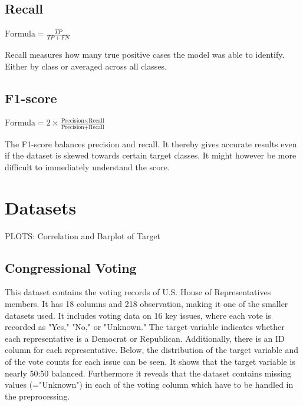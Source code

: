 \documentclass{article}
\begin{document}
\subsection{Recall}
$\text{Formula} = \frac{TP}{TP + FN}$

Recall measures how many true positive cases the model was able to identify. Either by class or averaged
across all classes.

\subsection{F1-score}

$\text{Formula}  = 2 \times \frac{\text{Precision} \times \text{Recall}}{\text{Precision} + \text{Recall}}$

The F1-score balances precision and recall. It thereby gives accurate results even if the dataset is skewed towards certain target classes. It might however be more difficult to immediately understand the score.

\section{Datasets}
PLOTS: Correlation and Barplot of Target

\subsection{Congressional Voting}
This dataset contains the voting records of U.S. House of Representatives members. It has 18 columns and 218 observation, making it one of the smaller datasets used. It includes voting data on 16 key issues, where each vote is recorded as "Yes," "No," or "Unknown." The target variable indicates whether each representative is a Democrat or Republican. Additionally, there is an ID column for each representative. Below, the distribution of the target variable and of the vote counts for each issue can be seen. It shows that the target variable is nearly 50:50 balanced. Furthermore it reveals that the dataset contains missing values (="Unknown") in each of the voting column which have to be handled in the preprocessing.
\end{document}
